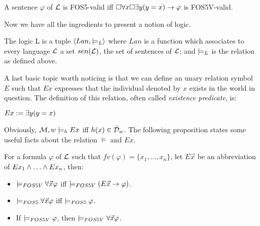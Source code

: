 \begin{pro}
A sentence $\varphi$ of $\mathcal{L}$ is FOS5-valid iff $\Box \forall x \Box \exists y (y=x) \rightarrow \varphi$ is FOS5V-valid. 
\end{pro}

Now we have all the ingredients to present a notion of logic.

\begin{defn}
The logic L is a tuple $\langle Lan, \models_{L}\rangle$ where $Lan$ is a function which associates to every language $\mathcal{L}$ a set $sen(\mathcal{L})$, the set of sentences of $\mathcal{L}$; and $\models_{L}$ is the relation as defined above.
\end{defn}

\qquad A last basic topic worth noticing is that we can define an unary relation symbol $E$ such that $Ex$ expresses that the individual denoted by $x$ exists in the world in question. The definition of this relation, often called \textit{existence predicate},  is:

\begin{center}
$Ex:= \exists y (y=x) $
\end{center}

\qquad Obviously, $\mathcal{M},w \models_{h} Ex$ iff $h(x) \in \bar{\mathcal{D}}_{w}$. The following proposition states some useful facts about the relation $\models$ and $Ex$. 

\begin{pro}
For a formula $\varphi$ of $\mathcal{L}$ such that $fv(\varphi) = \{x_1, \dots, x_n\}$, let $E\vec{x}$ be an abbreviation of $Ex_{1} \e \dots \e Ex_{n}$, then:
\begin{itemize}
\item $\models_{FOS5V} \forall \vec{x}\varphi$ iff $\models_{FOS5V} (E\vec{x} \rightarrow \varphi)$.
\item $\models_{FOS5} \forall \vec{x}\varphi$ iff $\models_{FOS5} \varphi$.
\item If $\models_{FOS5V}\varphi$, then $\models_{FOS5V} \forall \vec{x}\varphi$.
\end{itemize}
\end{pro}


